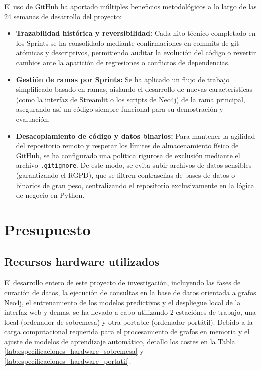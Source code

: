 \documentclass[12pt,a4paper,onecolumn,oneside]{report}
\begin{document}
El uso de GitHub ha aportado múltiples beneficios metodológicos a lo largo de las 24 semanas de desarrollo del proyecto:
\begin{itemize}
    \item \textbf{Trazabilidad histórica y reversibilidad:} Cada hito técnico completado en los Sprints se ha consolidado mediante confirmaciones en commits de git atómicas y descriptivos, permitiendo auditar la evolución del código o revertir cambios ante la aparición de regresiones o conflictos de dependencias.
    \item \textbf{Gestión de ramas por Sprints:} Se ha aplicado un flujo de trabajo simplificado basado en ramas, aislando el desarrollo de nuevas características (como la interfaz de Streamlit o los scripts de Neo4j) de la rama principal, asegurando así un código siempre funcional para su demostración y evaluación.
    \item \textbf{Desacoplamiento de código y datos binarios:} Para mantener la agilidad del repositorio remoto y respetar los límites de almacenamiento físico de GitHub, se ha configurado una política rigurosa de exclusión mediante el archivo \texttt{.gitignore}. De este modo, se evita subir archivos de datos sensibles (garantizando el RGPD), que se filtren contraseñas de bases de datos o binarios de gran peso, centralizando el repositorio exclusivamente en la lógica de negocio en Python.
\end{itemize}

\chapter{Presupuesto} 
\section{Recursos hardware utilizados}

El desarrollo entero de este proyecto de investigación, incluyendo las fases de curación de datos, la ejecución de consultas en la base de datos orientada a grafos Neo4j, el entrenamiento de los modelos predictivos y el despliegue local de la interfaz web y demas, se ha llevado a cabo utilizando 2 estaciónes de trabajo, una local (ordenador de sobremesa) y otra portable (ordenador portátil). Debido a la carga computacional requerida para el procesamiento de grafos en memoria y el ajuste de modelos de aprendizaje automático, detallo los costes en la Tabla \ref{tab:especificaciones_hardware_sobremesa} y \ref{tab:especificaciones_hardware_portatil}.
\end{document}
